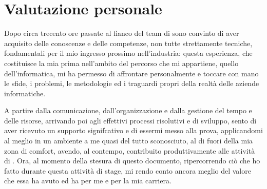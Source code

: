 \section{Valutazione personale}

Dopo circa trecento ore passate al fianco del team di \myAzienda{} sono convinto di aver acquisito delle conoscenze e delle competenze, non tutte strettamente tecniche, fondamentali per il mio ingresso prossimo nell'industria: questa esperienza, che costituisce la mia prima nell'ambito del percorso che mi appartiene, quello dell'informatica, mi ha permesso di affrontare personalmente e toccare con mano le sfide, i problemi, le metodologie ed i traguardi propri della realtà delle aziende informatiche.

A partire dalla comunicazione, dall'organizzazione e dalla gestione del tempo e delle risorse, arrivando poi agli effettivi processi risolutivi e di sviluppo, sento di aver ricevuto un supporto signifcativo e di essermi messo alla prova, applicandomi al meglio in un ambiente a me quasi del tutto sconosciuto, al di fuori della mia zona di comfort, avendo, al contempo, contribuito produttivamente alle attività di \myAzienda.
Ora, al momento della stesura di questo documento, ripercorrendo ciò che ho fatto durante questa attività di stage, mi rendo conto ancora meglio del valore che essa ha avuto ed ha per me e per la mia carriera.
